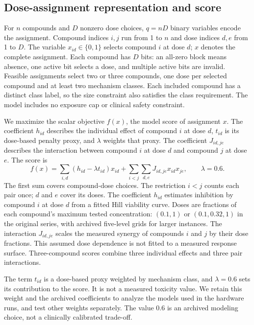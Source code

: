 \documentclass[utf8]{FrontiersinHarvard}
\begin{document}
\subsection{Dose-assignment representation and score}
For $n$ compounds and $D$ nonzero dose choices, $q=nD$ binary variables encode the assignment. Compound indices $i,j$ run from 1 to $n$ and dose indices $d,e$ from 1 to $D$. The variable $x_{id}\in\{0,1\}$ selects compound $i$ at dose $d$; $x$ denotes the complete assignment. Each compound has $D$ bits: an all-zero block means absence, one active bit selects a dose, and multiple active bits are invalid. Feasible assignments select two or three compounds, one dose per selected compound and at least two mechanism classes. Each included compound has a distinct class label, so the size constraint also satisfies the class requirement. The model includes no exposure cap or clinical safety constraint.

We maximize the scalar objective $f(x)$, the model score of assignment $x$. The coefficient $h_{id}$ describes the individual effect of compound $i$ at dose $d$, $t_{id}$ is its dose-based penalty proxy, and $\lambda$ weights that proxy. The coefficient $J_{id,je}$ describes the interaction between compound $i$ at dose $d$ and compound $j$ at dose $e$. The score is
\begin{equation}
 f(x)=\sum_{i,d}(h_{id}-\lambda t_{id})x_{id}
       +\sum_{i<j}\sum_{d,e}J_{id,je}x_{id}x_{je},\qquad\lambda=0.6.
 \label{eq:score}
\end{equation}
The first sum covers compound-dose choices. The restriction $i<j$ counts each pair once; $d$ and $e$ cover its doses. The coefficient $h_{id}$ estimates inhibition by compound $i$ at dose $d$ from a fitted Hill viability curve. Doses are fractions of each compound's maximum tested concentration: $(0.1,1)$ or $(0.1,0.32,1)$ in the original series, with archived five-level grids for larger instances. The interaction $J_{id,je}$ scales the measured synergy of compounds $i$ and $j$ by their dose fractions. This assumed dose dependence is not fitted to a measured response surface. Three-compound scores combine three individual effects and three pair interactions.

The term $t_{id}$ is a dose-based proxy weighted by mechanism class, and $\lambda=0.6$ sets its contribution to the score. It is not a measured toxicity value. We retain this weight and the archived coefficients to analyze the models used in the hardware runs, and test other weights separately. The value 0.6 is an archived modeling choice, not a clinically calibrated trade-off.
\end{document}
